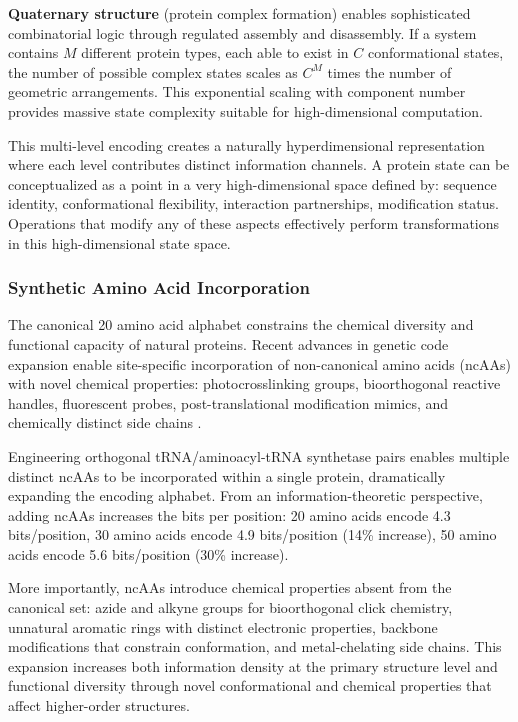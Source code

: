 \documentclass[12pt]{article}
\begin{document}
\textbf{Quaternary structure} (protein complex formation) enables sophisticated combinatorial logic through regulated assembly and disassembly. If a system contains $M$ different protein types, each able to exist in $C$ conformational states, the number of possible complex states scales as $C^M$ times the number of geometric arrangements. This exponential scaling with component number provides massive state complexity suitable for high-dimensional computation.

This multi-level encoding creates a naturally hyperdimensional representation where each level contributes distinct information channels. A protein state can be conceptualized as a point in a very high-dimensional space defined by: sequence identity, conformational flexibility, interaction partnerships, modification status. Operations that modify any of these aspects effectively perform transformations in this high-dimensional state space.

\subsubsection{Synthetic Amino Acid Incorporation}

The canonical 20 amino acid alphabet constrains the chemical diversity and functional capacity of natural proteins. Recent advances in genetic code expansion enable site-specific incorporation of non-canonical amino acids (ncAAs) with novel chemical properties: photocrosslinking groups, bioorthogonal reactive handles, fluorescent probes, post-translational modification mimics, and chemically distinct side chains \citep{Chin2017}.

Engineering orthogonal tRNA/aminoacyl-tRNA synthetase pairs enables multiple distinct ncAAs to be incorporated within a single protein, dramatically expanding the encoding alphabet. From an information-theoretic perspective, adding ncAAs increases the bits per position: 20 amino acids encode 4.3 bits/position, 30 amino acids encode 4.9 bits/position (14\% increase), 50 amino acids encode 5.6 bits/position (30\% increase).

More importantly, ncAAs introduce chemical properties absent from the canonical set: azide and alkyne groups for bioorthogonal click chemistry, unnatural aromatic rings with distinct electronic properties, backbone modifications that constrain conformation, and metal-chelating side chains. This expansion increases both information density at the primary structure level and functional diversity through novel conformational and chemical properties that affect higher-order structures.
\end{document}

